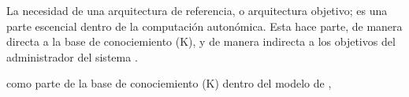 La necesidad de una arquitectura de referencia, o arquitectura objetivo; es una parte escencial dentro de la computación autonómica. Esta hace parte, de manera directa a la base de conociemiento (K), y de manera indirecta a los objetivos del administrador del sistema \cite[p. 24w]{lalanda_diaconescu_mccann_2014}. 

como parte de la base de conociemiento (K) dentro del modelo de , 

